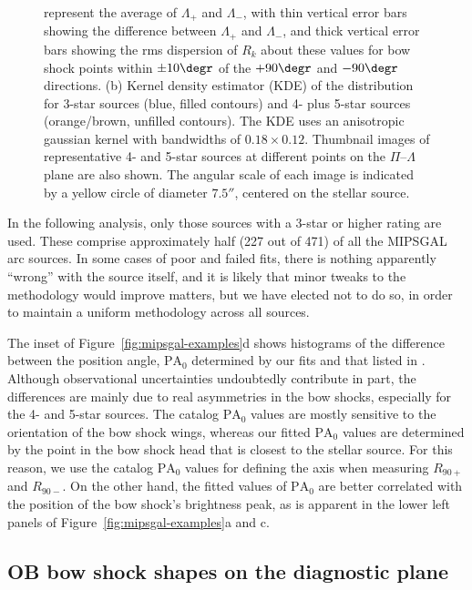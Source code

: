 \begin{figure}
{    represent the average of \(\Lambda_{+}\) and \(\Lambda_{-}\), with thin
    vertical error bars showing the difference between \(\Lambda_{+}\) and
    \(\Lambda_{-}\), and thick vertical error bars showing the rms
    dispersion of \(R_k\) about these values for bow shock points
    within \(\pm 10\degr\) of the \(+90\degr\) and \(-90\degr\)
    directions.  (b) Kernel density estimator (KDE) of the
    distribution for 3-star sources (blue, filled contours) and 4-
    plus 5-star sources (orange/brown, unfilled contours).  The KDE
    uses an anisotropic gaussian kernel with bandwidths of
    \(0.18 \times 0.12\). Thumbnail images of representative 4- and 5-star
    sources at different points on the \(\Pi\)--\(\Lambda\) plane are
    also shown. The angular scale of each image is indicated by a
    yellow circle of diameter \(7.5''\), centered on the stellar
    source.}
  \label{fig:mipsgal-shapes}
\end{figure}

In the following analysis, only those sources with a 3-star or higher
rating are used.  These comprise approximately half (227 out of 471)
of all the MIPSGAL arc sources.  In some cases of poor and failed
fits, there is nothing apparently ``wrong'' with the source itself,
and it is likely that minor tweaks to the methodology would improve
matters, but we have elected not to do so, in order to maintain a
uniform methodology across all sources.

The inset of Figure~\ref{fig:mipsgal-examples}d shows histograms of
the difference between the position angle, \(\text{PA}_0\) determined
by our fits and that listed in \citet{Kobulnicky:2016a}.  Although
observational uncertainties undoubtedly contribute in part, the
differences are mainly due to real asymmetries in the bow shocks,
especially for the 4- and 5-star sources.  The
\citeauthor{Kobulnicky:2016a} catalog \(\text{PA}_0\) values are
mostly sensitive to the orientation of the bow shock wings, whereas
our fitted \(\text{PA}_0\) values are determined by the point in the
bow shock head that is closest to the stellar source.  For this
reason, we use the catalog \(\text{PA}_0\) values for defining the
axis when measuring \(R_{90+}\) and \(R_{90-}\). On the other hand,
the fitted values of \(\text{PA}_0\) are better correlated with the
position of the bow shock's brightness peak, as is apparent in the
lower left panels of Figure~\ref{fig:mipsgal-examples}a and c.

\subsection{OB bow shock shapes on the diagnostic plane}
\label{sec:ob-shapes}

